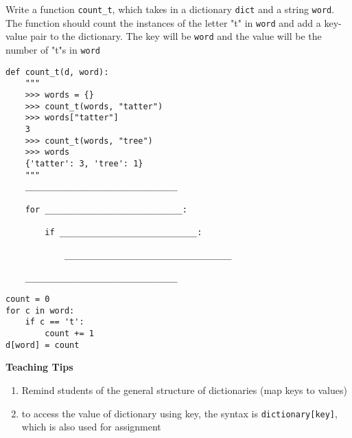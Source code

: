 \begin{blocksection}
\question Write a function \lstinline$count_t$, which takes in a dictionary \lstinline$dict$ and a string \lstinline$word$.
The function should count the instances of the letter "t" in \lstinline$word$ and add a key-value pair to the dictionary.
The key will be \lstinline$word$ and the value will be the number of "t"s in \lstinline$word$

\begin{lstlisting}
def count_t(d, word):
    """
    >>> words = {}
    >>> count_t(words, "tatter")
    >>> words["tatter"]
    3
    >>> count_t(words, "tree")
    >>> words
    {'tatter': 3, 'tree': 1}
    """
    _______________________________
    
    for ____________________________:

        if ____________________________:

            __________________________________

    _______________________________

\end{lstlisting}

\begin{solution}
\begin{lstlisting}
count = 0
for c in word:
    if c == 't':
        count += 1
d[word] = count
\end{lstlisting}
\end{solution}

\begin{blocksection}
    \begin{meta}
    \textbf{Teaching Tips}
    \begin{enumerate}
            \item Remind students of the general structure of dictionaries (map keys to values)
            \item to access the value of dictionary using key, the syntax is \lstinline$dictionary[key]$, which is also used for assignment
    \end{enumerate}
    \end{meta}
\end{blocksection}

\end{blocksection}
    
    